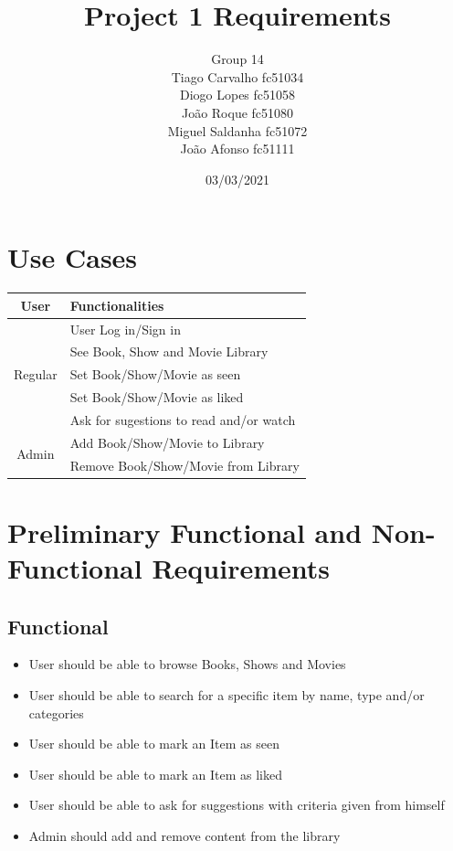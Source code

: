 \documentclass{article}
\title{Project 1 Requirements}
\author{Group 14 \\
Tiago Carvalho fc51034 \\
Diogo Lopes fc51058 \\
João Roque fc51080 \\
Miguel Saldanha fc51072 \\
João Afonso fc51111 \\
}
\date{03/03/2021}
\begin{document}
\maketitle

\section{Use Cases}
  \begin{table}[H]
    \centering
    \begin{tabular}{c|l} 
      User & Functionalities \\ \hline
      \multirow{5}{*}{ Regular } 
        & User Log in/Sign in \\
        & See Book, Show and Movie Library \\
        & Set Book/Show/Movie as seen \\
        & Set Book/Show/Movie as liked \\ 
        & Ask for sugestions to read and/or watch  \\ \hline
      \multirow{2}{*}{ Admin } 
        & Add Book/Show/Movie to Library \\
        & Remove Book/Show/Movie from Library
    \end{tabular}
  \end{table}

\section{Preliminary Functional and Non-Functional Requirements}
  
  \subsection{Functional}
    \begin{itemize}
      \item User should be able to browse Books, Shows and Movies
      \item User should be able to search for a specific item by name, type and/or categories
      \item User should be able to mark an Item as seen 
      \item User should be able to mark an Item as liked
      \item User should be able to ask for suggestions with criteria given from himself
      \item Admin should add and remove content from the library
    \end{itemize}
\end{document}
